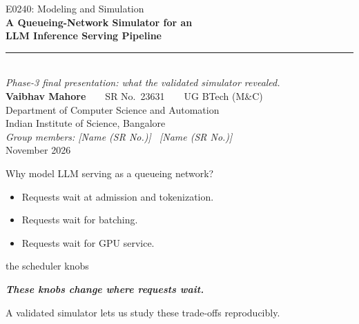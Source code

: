 \documentclass[aspectratio=169]{beamer}
\begin{document}
\begin{frame}[plain]
  \centering
  {\small\textcolor{MutedColor}{E0240: Modeling and Simulation}}\\[0.55cm]
  {\LARGE\bfseries\textcolor{InkColor}{A Queueing-Network Simulator for an\\[0.12cm] LLM Inference Serving Pipeline}}\\[0.42cm]
  {\color{PrColor}\rule{0.26\textwidth}{1pt}}\\[0.42cm]
  {\normalsize\itshape\textcolor{MutedColor}{Phase-3 final presentation: what the validated simulator revealed.}}\\[0.62cm]
  {\normalsize\textbf{Vaibhav Mahore}\ \ \textperiodcentered\ \ SR No.\ 23631\ \ \textperiodcentered\ \ UG BTech (M\&C)}\\[0.14cm]
  {\small\textcolor{MutedColor}{Department of Computer Science and Automation\\ Indian Institute of Science, Bangalore}}\\[0.3cm]
  {\small\itshape\textcolor{MutedColor}{Group members: [Name (SR No.)] \textperiodcentered\ [Name (SR No.)]}}\\[0.3cm]
  {\small\textcolor{MutedColor}{November 2026}}
\end{frame}

\begin{frame}{Why model LLM serving as a queueing network?}
  \begin{itemize}
    \item Requests wait at admission and tokenization.
    \item Requests wait for batching.
    \item Requests wait for GPU service.
  \end{itemize}
  \vfill
  \centering
  {\normalsize\textcolor{MutedColor}{the scheduler knobs}}\quad{\Large\textcolor{PrColor}{$(B,\ \tau,\ c)$}}
  \vfill
  \raggedright
  {\color{PrColor}\bfseries\itshape These knobs change where requests wait.}
  \smallskip

  A validated simulator lets us study these trade-offs reproducibly.
\end{frame}
\end{document}
